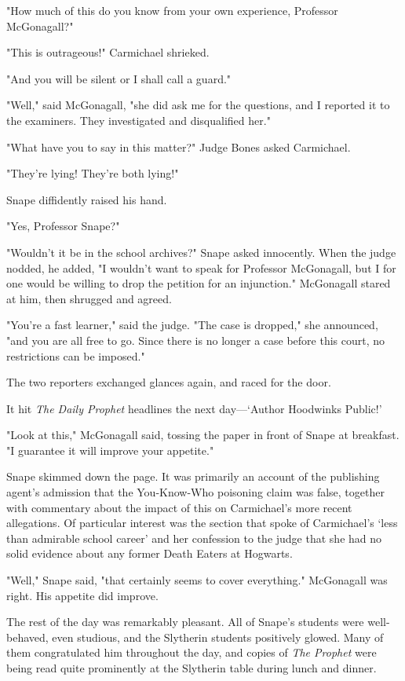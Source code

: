"How much of this do you know from your own experience, Professor McGonagall?"

"This is outrageous!" Carmichael shrieked.

"And you will be silent or I shall call a guard."

"Well," said McGonagall, "she did ask me for the questions, and I reported it to the examiners. They investigated and disqualified her."

"What have you to say in this matter?" Judge Bones asked Carmichael.

"They're lying! They're both lying!"

Snape diffidently raised his hand.

"Yes, Professor Snape?"

"Wouldn't it be in the school archives?" Snape asked innocently. When the judge nodded, he added, "I wouldn't want to speak for Professor McGonagall, but I for one would be willing to drop the petition for an injunction." McGonagall stared at him, then shrugged and agreed.

"You're a fast learner," said the judge. "The case is dropped," she announced, "and you are all free to go. Since there is no longer a case before this court, no restrictions can be imposed."

The two reporters exchanged glances again, and raced for the door.

It hit \emph{The Daily Prophet} headlines the next day—`Author Hoodwinks Public!'

"Look at this," McGonagall said, tossing the paper in front of Snape at breakfast. "I guarantee it will improve your appetite."

Snape skimmed down the page. It was primarily an account of the publishing agent's admission that the You-Know-Who poisoning claim was false, together with commentary about the impact of this on Carmichael's more recent allegations. Of particular interest was the section that spoke of Carmichael's `less than admirable school career' and her confession to the judge that she had no solid evidence about any former Death Eaters at Hogwarts.

"Well," Snape said, "that certainly seems to cover everything." McGonagall was right. His appetite did improve.

The rest of the day was remarkably pleasant. All of Snape's students were well-behaved, even studious, and the Slytherin students positively glowed. Many of them congratulated him throughout the day, and copies of \emph{The Prophet} were being read quite prominently at the Slytherin table during lunch and dinner.

